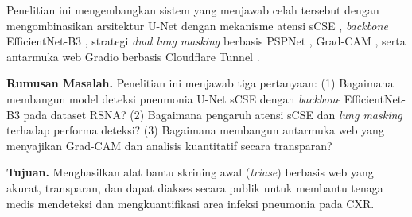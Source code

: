 \documentclass[12pt,a4paper,twocolumn]{article}
\newcommand{\parencite}[1]{\citep{#1}}
\begin{document}
\begin{table}[H]
  \centering
  \caption{Perbandingan Penelitian Terdahulu Deteksi Pneumonia.}
  \label{tab:penelitian_terdahulu}
\end{table}

Penelitian ini mengembangkan sistem yang menjawab celah tersebut dengan
mengombinasikan arsitektur U-Net dengan mekanisme atensi sCSE
\parencite{roy2018scse}, \textit{backbone} EfficientNet-B3 \parencite{tan2019efficientnet},
strategi \textit{dual lung masking} berbasis PSPNet \parencite{teixeira2020},
Grad-CAM \parencite{selvaraju2017gradcam}, serta antarmuka web Gradio
berbasis Cloudflare Tunnel \parencite{cloudflare2024}.

\textbf{Rumusan Masalah.} Penelitian ini menjawab tiga pertanyaan: (1)
Bagaimana membangun model deteksi pneumonia U-Net sCSE dengan \textit{backbone}
EfficientNet-B3 pada dataset RSNA? (2) Bagaimana pengaruh atensi sCSE dan
\textit{lung masking} terhadap performa deteksi? (3) Bagaimana membangun
antarmuka web yang menyajikan Grad-CAM dan analisis kuantitatif secara
transparan?

\textbf{Tujuan.} Menghasilkan alat bantu skrining awal (\textit{triase})
berbasis web yang akurat, transparan, dan dapat diakses secara publik untuk
membantu tenaga medis mendeteksi dan mengkuantifikasi area infeksi pneumonia
pada CXR.

\end{document}
